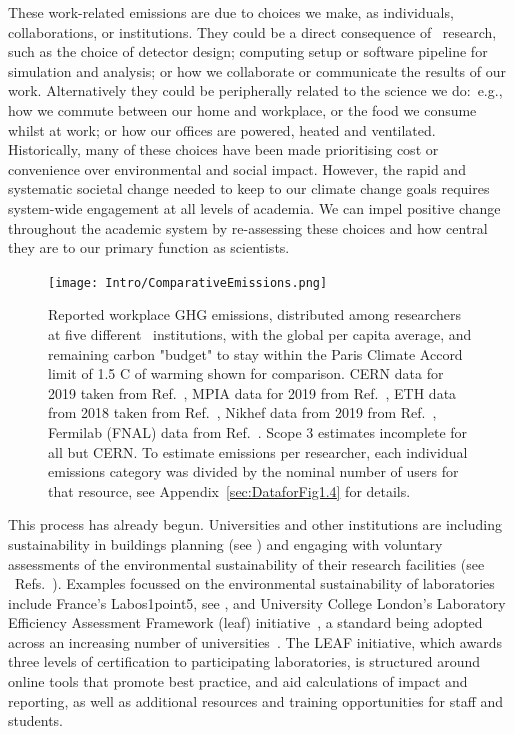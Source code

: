 \documentclass[../SustainableHEP.tex]{subfiles}
\begin{document}
These work-related emissions are due to choices we make, as individuals, collaborations, or institutions.  They could be a direct consequence of \ACR\ research, such as the choice of detector design; computing setup or software pipeline for simulation and analysis; or how we collaborate or communicate the results of our work.  Alternatively they could be peripherally related to the science we do:~e.g., how we commute between our home and workplace, or the food we consume whilst at work; or how our offices are powered, heated and ventilated. 
Historically, many of these choices have been made prioritising cost or convenience over environmental and social impact.  However, the rapid and systematic societal change needed to keep to our climate change goals requires system-wide engagement at all levels of academia.  We can impel positive change throughout the academic system by re-assessing these choices and how central they are to our primary function as scientists.

\begin{figure}[!ht]
    \centering
    \texttt{[image: Intro/ComparativeEmissions.png]}
    \caption[Reported workplace GHG emissions for researchers at \ACR\ institutions]{Reported workplace GHG emissions, distributed among researchers at five different \ACR\ institutions, with the global per capita average, and remaining carbon "budget" to stay within the Paris Climate Accord limit of 1.5 \degree C of warming shown for comparison.
    CERN data for 2019 taken from Ref.~\cite{Environment:2737239,CERN-HR-STAFF-STAT-2019,CERN:2723123,Hartley}, MPIA data for 2019 from Ref.~\cite{Jahnke2020}, ETH data from 2018 taken from Ref.~\cite{Beisert2020}, Nikhef data from 2019 from Ref.~\cite{Nikhef}, Fermilab (FNAL) data from Ref.~\cite{FermilabEnvReport2019}. Scope 3 estimates incomplete for all but CERN.  To estimate emissions per researcher, each individual emissions category was divided by the nominal number of users for that resource, see Appendix~\ref{sec:DataforFig1.4} for details.  
    \label{fig:Intro-ComparativeEmissions}}
\end{figure}

This process has already begun. Universities and other institutions are including sustainability in buildings planning (see ) and engaging with voluntary assessments of the environmental sustainability of their research facilities (see \eg~Refs.~\cite{Environment:2737239, Jahnke2020, Beisert2020, Nikhef, FermilabEnvReport2019}). Examples focussed on the environmental sustainability of laboratories include France's Labos1point5, see , and University College London’s Laboratory Efficiency Assessment Framework (\acrshort{leaf}) initiative~\cite{LEAF_framework, LEAF_take_part}, a standard being adopted across an increasing number of universities~\cite{LEAF_impact}. The LEAF initiative, which awards three levels of certification to participating laboratories, is structured around online tools that promote best practice, and aid calculations of impact and reporting, as well as additional resources and training opportunities for staff and students. 
\end{document}
